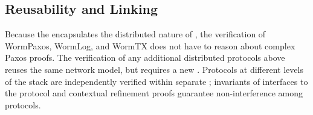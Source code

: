 %
%
\subsection{Reusability and Linking}
\label{subsec:proof_effort}

Because the \ghostlayer{} encapsulates the distributed nature of \sysname{}, the verification of WormPaxos, WormLog, and WormTX does not have to reason about complex Paxos proofs. %
The verification of any additional distributed protocols above \sysname{} reuses the same network model, but requires a new \ghostlayer{}. Protocols at different levels of the stack are independently verified within separate \ghostlayers{}; invariants of interfaces to the protocol and contextual refinement proofs guarantee non-interference among protocols. 

